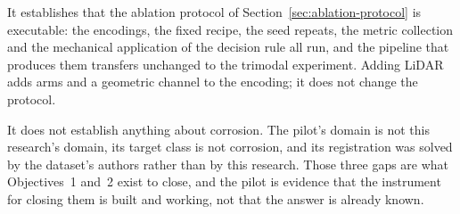 It establishes that the ablation protocol of
Section~\ref{sec:ablation-protocol} is executable: the encodings, the fixed
recipe, the seed repeats, the metric collection and the mechanical application
of the decision rule all run, and the pipeline that produces them transfers
unchanged to the trimodal experiment. Adding LiDAR adds arms and a geometric
channel to the encoding; it does not change the protocol.

It does not establish anything about corrosion. The pilot's domain is not this
research's domain, its target class is not corrosion, and its registration was
solved by the dataset's authors rather than by this research. Those three gaps
are what Objectives~1 and~2 exist to close, and the pilot is evidence that the
instrument for closing them is built and working, not that the answer is already
known.
